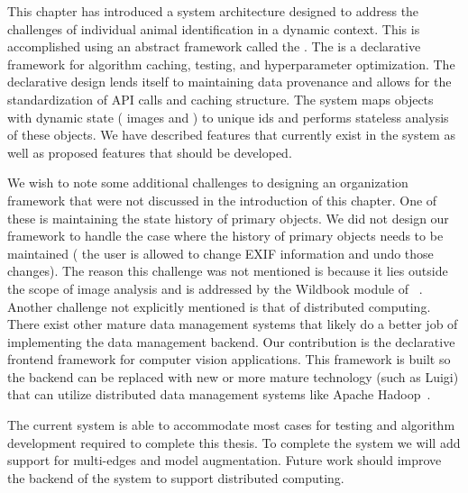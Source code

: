         This chapter has introduced a system architecture designed to address
          the challenges of individual animal identification in a dynamic
          context.
        This is accomplished using an abstract framework called the
          \depcache{}.
        The \depcache{} is a declarative framework for algorithm caching,
          testing, and hyperparameter optimization.
        The declarative design lends itself to maintaining data provenance and
          allows for the standardization of API calls and caching structure.
        The system maps objects with dynamic state (\eg{} images and
          \annots{}) to unique ids and performs stateless analysis of these
          objects.
        We have described features that currently exist in the system as well
          as proposed features that should be developed.

        We wish to note some additional challenges to designing an
          organization framework that were not discussed in the introduction of
          this chapter.
        One of these is maintaining the state history of primary objects.
        We did not design our framework to handle the case where the history
          of primary objects needs to be maintained (\ie{} the user is allowed
          to change EXIF information and undo those changes).
        The reason this challenge was not mentioned is because it  lies
          outside the scope of image analysis and is addressed by the Wildbook
          module of \IBEIS{}~\cite{j_bonner_mark_recapture_2013}.
        Another challenge not explicitly mentioned is that of distributed
          computing.
        There exist other mature data management systems that likely do a
          better job of implementing the data management backend.
        Our contribution is the declarative frontend framework for computer
          vision applications.
        This framework is built so the backend can be replaced with new or
          more mature technology (such as Luigi) that can utilize distributed
          data management systems like Apache
          Hadoop~\cite{shvachko_hadoop_2010}.

        The current system is able to accommodate most cases for testing and
          algorithm development required to complete this thesis.
        To complete the system we will add support for multi-edges and model
          augmentation.
        Future work should improve the backend of the system to support
          distributed computing.

